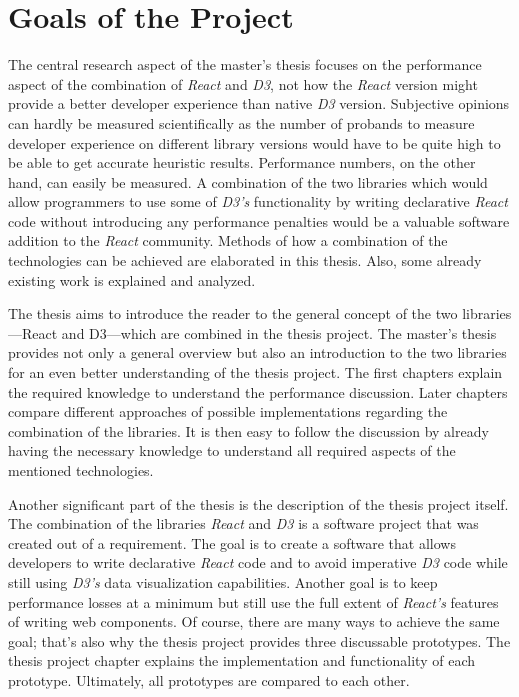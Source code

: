 \section{Goals of the Project}

The central research aspect of the master's thesis focuses on the performance aspect of the combination of \emph{React} and \emph{D3}, not how the \emph{React} version might provide a better developer experience than native \emph{D3} version. Subjective opinions can hardly be measured scientifically as the number of probands to measure developer experience on different library versions would have to be quite high to be able to get accurate heuristic results. Performance numbers, on the other hand, can easily be measured. A combination of the two libraries which would allow programmers to use some of \emph{D3's} functionality by writing declarative \emph{React} code without introducing any performance penalties would be a valuable software addition to the \emph{React} community. Methods of how a combination of the technologies can be achieved are elaborated in this thesis. Also, some already existing work is explained and analyzed.

The thesis aims to introduce the reader to the general concept of the two libraries---React and D3---which are combined in the thesis project. The master's thesis provides not only a general overview but also an introduction to the two libraries for an even better understanding of the thesis project. The first chapters explain the required knowledge to understand the performance discussion. Later chapters compare different approaches of possible implementations regarding the combination of the libraries. It is then easy to follow the discussion by already having the necessary knowledge to understand all required aspects of the mentioned technologies.

Another significant part of the thesis is the description of the thesis project itself. The combination of the libraries \emph{React} and \emph{D3} is a software project that was created out of a requirement. The goal is to create a software that allows developers to write declarative \emph{React} code and to avoid imperative \emph{D3} code while still using \emph{D3's} data visualization capabilities. Another goal is to keep performance losses at a minimum but still use the full extent of \emph{React's} features of writing web components. Of course, there are many ways to achieve the same goal; that's also why the thesis project provides three discussable prototypes. The thesis project chapter explains the implementation and functionality of each prototype. Ultimately, all prototypes are compared to each other.

